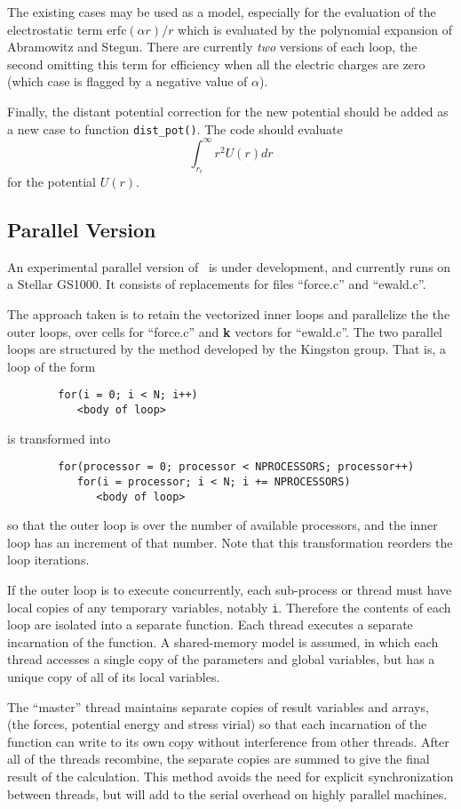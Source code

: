 The  existing  cases  may  be  used as  a    model, especially for the
evaluation of the electrostatic term $\mbox{erfc}(\alpha r) / r$ which
is    evaluated  by  the   polynomial  expansion    of  Abramowitz and
Stegun\cite[section 7.1.26]{abramowitz:70}. There  are  currently {\em
two\/}   versions of each    loop,  the   second omitting this  term for
efficiency when  all the  electric  charges  are  zero  (which case is
flagged by a negative value of $\alpha$).

Finally, the distant potential correction for the new potential should
be added as a new case to function \verb'dist_pot()'. The code should evaluate
\[
\int^{\infty}_{r_c} r^2 U(r) dr
\]
for the potential $U(r)$.
\subsection{Parallel Version}
An experimental parallel version of \moldy\  is under development, and
currently runs on a Stellar GS1000.   It consists of replacements for
files ``force.c'' and ``ewald.c''. 

The approach taken is to retain the vectorized inner loops and
parallelize the the outer loops, over cells for ``force.c'' and {\bf
k} vectors for ``ewald.c''.  The two parallel loops are structured by
the method developed by the Kingston group\cite{wojcik:85}. That is, a
loop of the form
\begin{verbatim}
        for(i = 0; i < N; i++)
           <body of loop>
\end{verbatim}
is transformed into
\begin{verbatim}
        for(processor = 0; processor < NPROCESSORS; processor++)
           for(i = processor; i < N; i += NPROCESSORS)
              <body of loop>
\end{verbatim}
so that the outer loop is over the number of available processors,
and the inner loop has an increment of that number.  Note that this
transformation reorders the loop iterations.

If the outer loop is to execute concurrently, each sub-process or
thread must have local copies of any temporary variables, notably
\verb'i'.  Therefore the contents of each loop are isolated into a
separate function. Each thread executes a separate incarnation
of the function.  A shared-memory model is assumed, in which each
thread accesses a single copy of the parameters and global
variables, but has a unique copy of all of its local variables.

The ``master'' thread maintains separate copies of result variables
and arrays, (\ie the forces, potential energy and stress virial) so
that each incarnation of the function can write to its own copy
without interference from other threads.  After all of the threads
recombine, the separate copies are summed to give the final result of
the calculation.  This method avoids the need for explicit
synchronization between threads, but will add to the serial overhead
on highly parallel machines.

